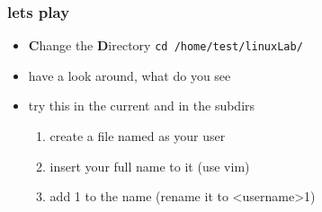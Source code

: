\documentclass[handout]{beamer}
\newcommand{\code}[1]{\colorbox{lGray}{\texttt{#1}}}
\begin{document}
        \begin{frame}
			\frametitle{lets play}
			\begin{itemize}
                \item<1-> \textbf{C}hange the \textbf{D}irectory \code{cd /home/test/linuxLab/}
                \item<2-> have a look around, what do you see
                \item<3-> try this in the current and in the subdirs
                \begin{enumerate}
                    \item<4-> create a file named as your user 
                    \item<4-> insert your full name to it (use vim)
                    \item<5-> add 1 to the name (rename it to \textless username\textgreater 1)
                \end{enumerate}
            \end{itemize}
		\end{frame}
    
\end{document}
